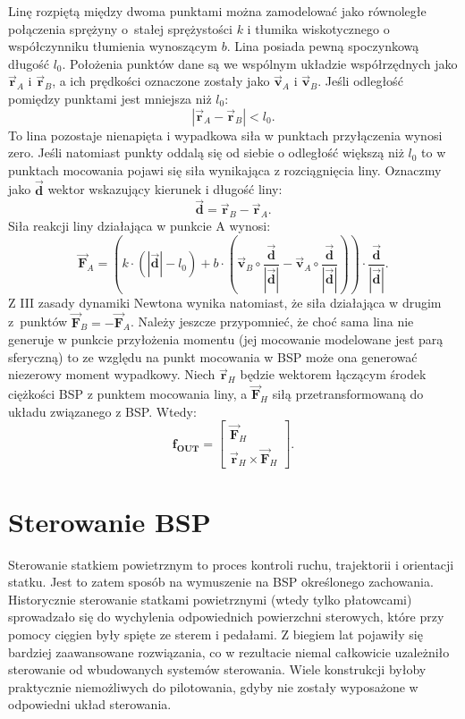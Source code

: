 Linę rozpiętą między dwoma punktami można zamodelować jako równoległe połączenia sprężyny o~stałej sprężystości $k$ i tłumika wiskotycznego o współczynniku tłumienia wynoszącym $b$. Lina posiada pewną spoczynkową długość $l_0$. Położenia punktów dane są we wspólnym układzie współrzędnych jako $\vec{\bm{r}}_{A}$ i $\vec{\bm{r}}_{B}$, a ich prędkości oznaczone zostały jako $\vec{\bm{v}}_{A}$ i $\vec{\bm{v}}_{B}$. Jeśli odległość pomiędzy punktami jest mniejsza niż $l_0$:
\[
	| \vec{\bm{r}}_{A} - \vec{\bm{r}}_{B} | < l_0.
\]
To lina pozostaje nienapięta i wypadkowa siła w punktach przyłączenia wynosi zero. Jeśli natomiast punkty oddalą się od siebie o odległość większą niż $l_0$ to w punktach mocowania pojawi się siła wynikająca z rozciągnięcia liny. Oznaczmy jako $\vec{\bm{d}}$ wektor wskazujący kierunek i długość liny:
\[
	\vec{\bm{d}} =  \vec{\bm{r}}_{B} - \vec{\bm{r}}_{A}.
\]
Siła reakcji liny działająca w punkcie A wynosi:
\[
	\vec{\bm{F}}_{A} =\left(  k \cdot \left( |\vec{\bm{d}}| - l_0 \right) + b \cdot \left( \vec{\bm{v}}_{B}  \circ \frac{\vec{\bm{d}}}{|\vec{\bm{d}}|} - \vec{\bm{v}}_{A} \circ \frac{\vec{\bm{d}}}{|\vec{\bm{d}}|} \right) \right)  \cdot \frac{\vec{\bm{d}}}{|\vec{\bm{d}}|}.
\]
Z III zasady dynamiki Newtona wynika natomiast, że siła działająca w drugim z~punktów $\vec{\bm{F}}_{B} = - \vec{\bm{F}}_{A}$. Należy jeszcze przypomnieć, że choć sama lina nie generuje w punkcie przyłożenia momentu (jej mocowanie modelowane jest parą sferyczną) to ze względu na punkt mocowania w BSP może ona generować niezerowy moment wypadkowy. Niech $\vec{\bm{r}}_{H}$ będzie wektorem łączącym środek ciężkości BSP z punktem mocowania liny, a $\vec{\bm{F}}_{H}$ siłą przetransformowaną do układu związanego z BSP. Wtedy:
\[
	\bm{f_{OUT}} = \begin{bmatrix} \vec{\bm{F}}_{H} \\ \vec{\bm{r}}_{H} \times \vec{\bm{F}}_{H} \end{bmatrix}.
\]


\section{Sterowanie BSP} \label{sterowanie}

Sterowanie statkiem powietrznym to proces kontroli ruchu, trajektorii i orientacji statku. Jest to zatem sposób na wymuszenie na BSP określonego zachowania. Historycznie sterowanie statkami powietrznymi (wtedy tylko płatowcami) sprowadzało się do wychylenia odpowiednich powierzchni sterowych, które przy pomocy cięgien były spięte ze sterem i pedałami. Z biegiem lat pojawiły się bardziej zaawansowane rozwiązania, co w rezultacie niemal całkowicie uzależniło sterowanie od wbudowanych systemów sterowania. Wiele konstrukcji byłoby praktycznie niemożliwych do pilotowania, gdyby nie zostały wyposażone w odpowiedni układ sterowania.\\


